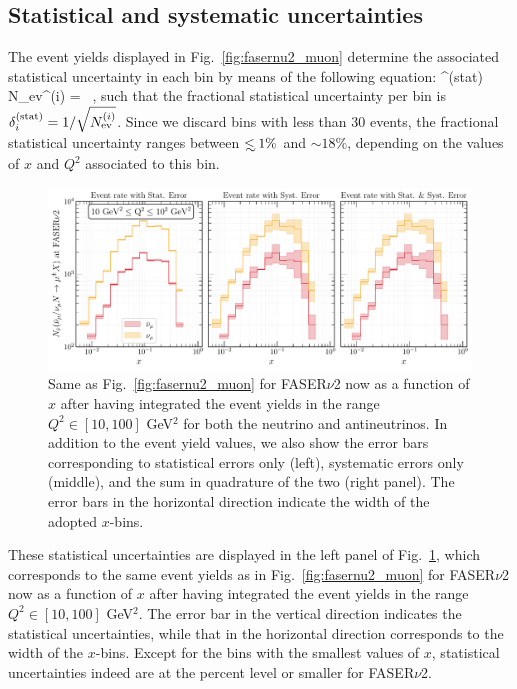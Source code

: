 \subsection{Statistical and systematic uncertainties}
\label{subsec:uncertainties}

The event yields displayed in Fig.~\ref{fig:fasernu2_muon} determine the associated statistical uncertainty 
in each bin by means of the following equation:
\be
\label{eq:statistical_uncertainties}
\delta^{\rm (stat)}  N_{\rm ev}^{(i)} =  \, ,
\ee
such that the fractional statistical uncertainty per bin is $\delta^{\rm (stat)}_i=1/\sqrt{N_{\rm ev}^{(i)}}$.
%
Since we discard bins with less than 30 events, the fractional statistical uncertainty
ranges between $\lsim 1\%$ and $\sim 18\%$, depending on the values of
$x$ and $Q^2$ associated to this bin.

\begin{figure}[h]
    \centering
    \includegraphics[width = \textwidth]{plots/Event_Rate_FASERv2.pdf}
    \caption{Same as Fig.~\ref{fig:fasernu2_muon} for FASER$\nu$2
      now as a function of $x$ after having integrated the event yields in the range $Q^2 \in [10,100]$ GeV$^2$
      for both the neutrino and antineutrinos.
      In addition to the event yield values, we also show the error bars corresponding to
      statistical errors only (left), systematic errors only (middle), and the
      sum in quadrature of the two (right panel).
      The error bars in the horizontal direction indicate the width of the adopted $x$-bins.
      }
    \label{fig:error_plot_FASERv2_14}
\end{figure}

These statistical uncertainties are displayed in the left panel
of Fig.~\ref{fig:error_plot_FASERv2_14}, which corresponds
to the same event yields as in
Fig.~\ref{fig:fasernu2_muon} for FASER$\nu$2
now as a function of $x$ after having integrated the event
yields in the range $Q^2 \in [10,100]$ GeV$^2$.
%
The error bar in the vertical direction indicates the statistical uncertainties, while
that in the horizontal direction corresponds to the width of the $x$-bins.
%
Except for the bins with the smallest values of $x$, statistical uncertainties indeed
are at the percent level or smaller for FASER$\nu$2.

